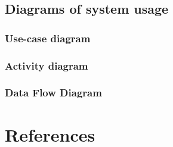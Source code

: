 \documentclass[12pt]{article}
\begin{document}
\subsection{Diagrams of system usage}
\subsubsection{Use-case diagram}
\subsubsection{Activity diagram}
\subsubsection{Data Flow Diagram}

\newpage
\section{References}
\end{document}
